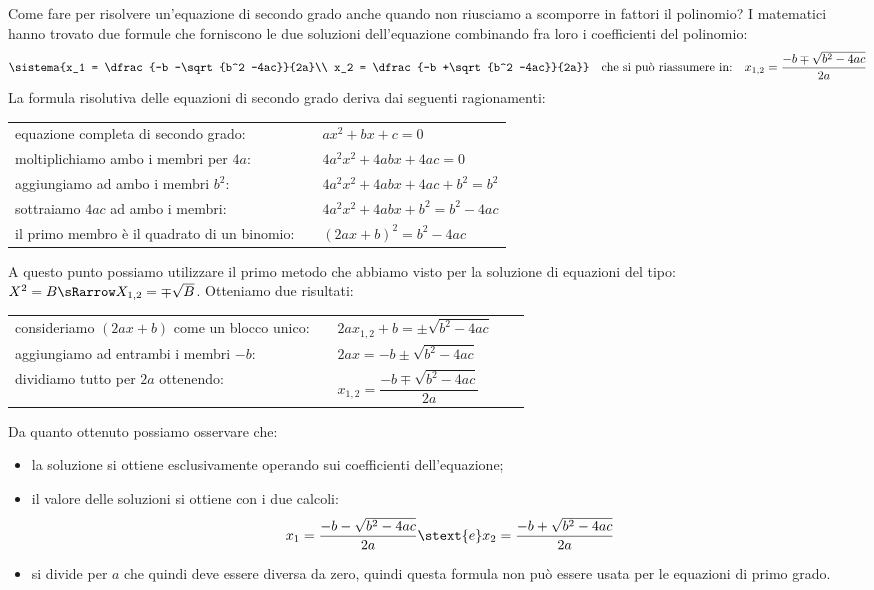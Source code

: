 Come fare per risolvere un'equazione di secondo grado anche quando non 
riusciamo a scomporre in fattori il polinomio?
I matematici hanno trovato due formule che forniscono le due soluzioni 
dell'equazione combinando fra loro i coefficienti del polinomio:
\[\sistema{x_1 = \dfrac{-b -\sqrt{b^2 -4ac}}{2a}\\
           x_2 = \dfrac{-b +\sqrt{b^2 -4ac}}{2a}} \quad 
  \text{che si può riassumere in:} \quad 
  x_{1,2} = \dfrac{-b \mp \sqrt{b^2 -4ac}}{2a}\]
La formula risolutiva delle equazioni di secondo grado deriva dai seguenti 
ragionamenti:
\begin{center}
\begin{tabular}{ll}
equazione completa di secondo grado: & \(ax^2 +b x +c=0\)\\
moltiplichiamo ambo i membri per \(4a\): & \(4a^2 x^2 +4 a b x +4 a c=0\)\\
aggiungiamo ad ambo i membri \(b^2\): & \(4a^2x^2 +4abx +4ac +b^2=b^2\)\\
sottraiamo \(4ac\) ad ambo i membri: & \(4a^2x^2 +4abx +b^2=b^2 -4ac\)\\
il primo membro è il quadrato di un binomio:~~ & \((2ax +b)^2=b^2 -4ac\)
\end{tabular}
\end{center}
A questo punto possiamo utilizzare il primo metodo che abbiamo visto per la 
soluzione di equazioni del tipo: 
\quad \(X^2=B \sRarrow X_{1,2}=\mp \sqrt{B}\). Otteniamo due risultati:
\begin{center}
\begin{tabular}{ll}
consideriamo \((2ax +b)\) come un blocco unico:~~ & 
    \(2ax_{1,2}+b=\pm \sqrt{b^2 -4ac}\) \quad ~~~\\
aggiungiamo ad entrambi i membri \(-b\): & \(2ax=-b \pm \sqrt{b^2 -4ac}\)\\
dividiamo tutto per \(2a\) ottenendo: & 
    \(x_{1,2} = \dfrac{-b \mp \sqrt{b^2 -4ac}}{2a}\)
\end{tabular}
\end{center}

Da quanto ottenuto possiamo osservare che:
\begin{itemize} [noitemsep]
\item la soluzione si ottiene esclusivamente operando sui coefficienti
dell'equazione;
\item il valore delle soluzioni si ottiene con i due calcoli: 
\[x_1 = \dfrac{-b -\sqrt{b^{2} -4 ac}}{2 a} \stext{e} 
  x_2 = \dfrac{-b +\sqrt{b^{2} -4 ac}}{2 a}\]
\item si divide per \(a\) che quindi deve essere diversa da zero,
quindi questa formula non può essere usata per le equazioni di primo grado.
\end{itemize}

